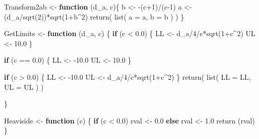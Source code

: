 \documentclass[
]{book}
\newenvironment{Shaded}{\begin{snugshade}}{\end{snugshade}}
\newcommand{\AttributeTok}[1]{\textcolor[rgb]{0.77,0.63,0.00}{#1}}
\newcommand{\ControlFlowTok}[1]{\textcolor[rgb]{0.13,0.29,0.53}{\textbf{#1}}}
\newcommand{\DecValTok}[1]{\textcolor[rgb]{0.00,0.00,0.81}{#1}}
\newcommand{\FloatTok}[1]{\textcolor[rgb]{0.00,0.00,0.81}{#1}}
\newcommand{\FunctionTok}[1]{\textcolor[rgb]{0.00,0.00,0.00}{#1}}
\newcommand{\NormalTok}[1]{#1}
\newcommand{\OtherTok}[1]{\textcolor[rgb]{0.56,0.35,0.01}{#1}}
\newcommand{\SpecialCharTok}[1]{\textcolor[rgb]{0.00,0.00,0.00}{#1}}
\begin{document}
\begin{Shaded}
\begin{Highlighting}[]
\NormalTok{Transform2ab }\OtherTok{\textless{}{-}} \ControlFlowTok{function}\NormalTok{ (d\_a, c)\{}
\NormalTok{  b }\OtherTok{\textless{}{-}} \SpecialCharTok{{-}}\NormalTok{(c}\SpecialCharTok{+}\DecValTok{1}\NormalTok{)}\SpecialCharTok{/}\NormalTok{(c}\DecValTok{{-}1}\NormalTok{)}
\NormalTok{  a }\OtherTok{\textless{}{-}}\NormalTok{ (d\_a}\SpecialCharTok{/}\FunctionTok{sqrt}\NormalTok{(}\DecValTok{2}\NormalTok{))}\SpecialCharTok{*}\FunctionTok{sqrt}\NormalTok{(}\DecValTok{1}\SpecialCharTok{+}\NormalTok{b}\SpecialCharTok{\^{}}\DecValTok{2}\NormalTok{)}
  \FunctionTok{return}\NormalTok{( }\FunctionTok{list}\NormalTok{(}
    \AttributeTok{a =}\NormalTok{ a,}
    \AttributeTok{b =}\NormalTok{ b}
\NormalTok{  ) )}
\NormalTok{\}}

\NormalTok{GetLimits }\OtherTok{\textless{}{-}} \ControlFlowTok{function}\NormalTok{ (d\_a, c)}
\NormalTok{\{}
  \ControlFlowTok{if}\NormalTok{ (c }\SpecialCharTok{\textless{}} \FloatTok{0.0}\NormalTok{) \{}
\NormalTok{    LL }\OtherTok{\textless{}{-}}\NormalTok{  d\_a}\SpecialCharTok{/}\DecValTok{4}\SpecialCharTok{/}\NormalTok{c}\SpecialCharTok{*}\FunctionTok{sqrt}\NormalTok{(}\DecValTok{1}\SpecialCharTok{+}\NormalTok{c}\SpecialCharTok{\^{}}\DecValTok{2}\NormalTok{)}
\NormalTok{    UL }\OtherTok{\textless{}{-}}  \FloatTok{10.0}
\NormalTok{  \}}
  
  \ControlFlowTok{if}\NormalTok{ (c }\SpecialCharTok{==} \FloatTok{0.0}\NormalTok{) }
\NormalTok{  \{}
\NormalTok{    LL  }\OtherTok{\textless{}{-}}  \SpecialCharTok{{-}}\FloatTok{10.0}
\NormalTok{    UL }\OtherTok{\textless{}{-}}  \FloatTok{10.0}
\NormalTok{  \}}
  
  \ControlFlowTok{if}\NormalTok{ (c }\SpecialCharTok{\textgreater{}} \FloatTok{0.0}\NormalTok{) }
\NormalTok{  \{}
\NormalTok{    LL }\OtherTok{\textless{}{-}}  \SpecialCharTok{{-}}\FloatTok{10.0}
\NormalTok{    UL }\OtherTok{\textless{}{-}}\NormalTok{  d\_a}\SpecialCharTok{/}\DecValTok{4}\SpecialCharTok{/}\NormalTok{c}\SpecialCharTok{*}\FunctionTok{sqrt}\NormalTok{(}\DecValTok{1}\SpecialCharTok{+}\NormalTok{c}\SpecialCharTok{\^{}}\DecValTok{2}\NormalTok{)}
\NormalTok{  \}}
  \FunctionTok{return}\NormalTok{( }\FunctionTok{list}\NormalTok{(}
    \AttributeTok{LL =}\NormalTok{ LL,}
    \AttributeTok{UL =}\NormalTok{ UL}
\NormalTok{  ) )}
  
\NormalTok{\}}



\NormalTok{Heaviside }\OtherTok{\textless{}{-}} \ControlFlowTok{function}\NormalTok{ (c)}
\NormalTok{\{}
  \ControlFlowTok{if}\NormalTok{ (c }\SpecialCharTok{\textless{}} \FloatTok{0.0}\NormalTok{) rval }\OtherTok{\textless{}{-}}  \FloatTok{0.0} \ControlFlowTok{else}\NormalTok{ rval  }\OtherTok{\textless{}{-}}  \FloatTok{1.0}
  \FunctionTok{return}\NormalTok{ (rval)}
\NormalTok{\}}


\end{Highlighting}
\end{Shaded}
\end{document}
